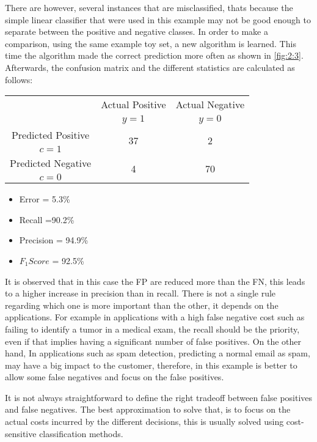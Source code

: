 There are however, several instances that are misclassified, thats because the simple linear 
classifier that were used in this example may not be good enough to separate between the positive 
and negative classes. In order to make a comparison, using the same example toy set, a new 
algorithm is learned. This time the algorithm made the correct prediction more often as shown in 
\figurename{ \ref{fig:2:3}}. Afterwards, the confusion matrix and the different statistics are 
calculated as follows:
\begin{center}
		\footnotesize
    \begin{tabular}{c|c|c}
			\multicolumn{1}{c|}{}  & Actual Positive& Actual Negative \\
			\multicolumn{1}{c|}{} & $y=1$& $y=0$ \\
			\hline
			Predicted Positive 		& \multirow{ 2}{*}{37} & \multirow{ 
			2}{*}{2} \\
			$c=1$ & &\\
			\hline
			Predicted Negative  	& \multirow{ 2}{*}{4} & \multirow{ 
			2}{*}{70} \\
			$c=0$ & &\\
		\end{tabular}
\end{center}
  \begin{itemize}
    \item Error = 5.3\%
    \item Recall =90.2\%
    \item Precision = 94.9\%
    \item $F_1Score$ = 92.5\%
  \end{itemize}
It is observed that in this case the FP are reduced more than the FN, this leads to a higher 
increase in precision  than in recall. There is not a single rule regarding which one is more 
important than the other, it depends on the applications. For example in applications with a high 
false negative cost such as failing to identify a tumor in a medical exam, the recall should be the 
priority, even if that implies having a significant number of false positives. On the other hand, 
In applications such as spam detection, predicting a normal email as spam, may have a big impact to 
the customer, therefore, in this example is better to allow some false negatives and focus on the 
false positives.

It is not always straightforward  to define the right tradeoff between false positives 
and false negatives. The best approximation to solve that, is to focus on the actual costs incurred 
by the different decisions, this is usually solved using cost-sensitive classification methods. 

